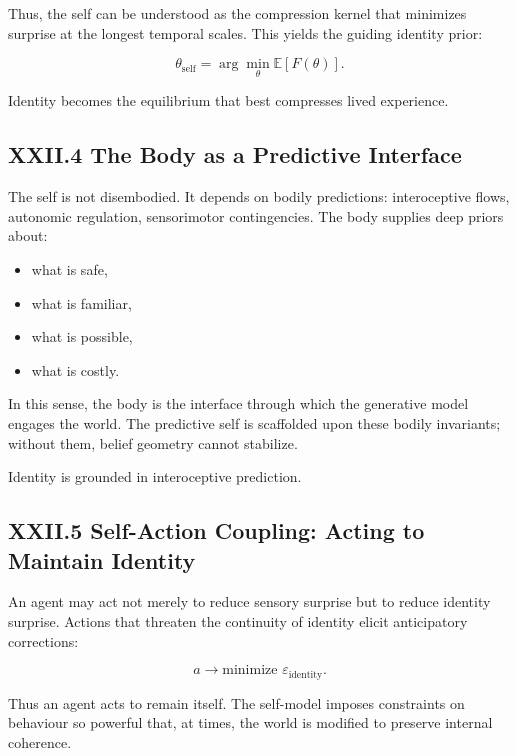 \documentclass[12pt,letterpaper]{article}
\begin{document}
Thus, the self can be understood as the compression kernel that minimizes surprise at the longest temporal scales.  
This yields the guiding identity prior:

\[
\theta_{\text{self}} = \arg\min_{\theta} \mathbb{E}[F(\theta)].
\]

Identity becomes the equilibrium that best compresses lived experience.

\subsection{XXII.4 The Body as a Predictive Interface}

The self is not disembodied. It depends on bodily predictions: interoceptive flows, autonomic regulation, sensorimotor contingencies.  
The body supplies deep priors about:

\begin{itemize}
    \item what is safe,
    \item what is familiar,
    \item what is possible,
    \item what is costly.
\end{itemize}

In this sense, the body is the interface through which the generative model engages the world.  
The predictive self is scaffolded upon these bodily invariants; without them, belief geometry cannot stabilize.

Identity is grounded in interoceptive prediction.

\subsection{XXII.5 Self-Action Coupling: Acting to Maintain Identity}

An agent may act not merely to reduce sensory surprise but to reduce identity surprise.  
Actions that threaten the continuity of identity elicit anticipatory corrections:

\[
a \to \text{minimize } \varepsilon_{\text{identity}}.
\]

Thus an agent acts to remain itself.  
The self-model imposes constraints on behaviour so powerful that, at times, the world is modified to preserve internal coherence.  
\end{document}
